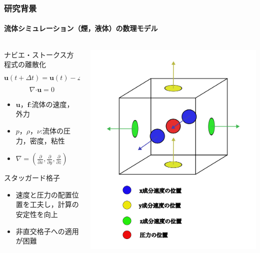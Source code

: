 \documentclass[aspectratio=169,dvipdfmx,hyperref={bookmarks=true}]{beamer}
\begin{document}
  \begin{frame}
  \frametitle{研究背景}
  \framesubtitle{流体シミュレーション（煙，液体）の数理モデル}

\begin{columns}[T]
	\begin{column}{0.65\linewidth}
	    \begin{block}{ナビエ・ストークス方程式の離散化}
    	\[
	\bm{u}(t + \varDelta t)  =\bm{u}(t) -\varDelta t( (\bm{u} \boldsymbol{\cdot}\nabla) \bm{u} - \frac{1}{\rho}\nabla p + \nu\nabla^2\bm{u} + \bm{f})
	\]
	\[
	\nabla\boldsymbol{\cdot}\bm{u} = 0
	\]
	\vspace{-10pt}
	\begin{itemize}
	\item $\bm{u}$，$\bm{f}$:流体の速度，外力
	\item $p$，$\rho$，$\nu$:流体の圧力，密度，粘性
	\item $\nabla = ( \frac{\partial}{\partial x}, \frac{\partial}{\partial y}, \frac{\partial}{\partial z})$
\end{itemize}
\end{block}
	\begin{block}{スタッガード格子}
		\begin{itemize}
		\item 速度と圧力の配置位置を工夫し，計算の安定性を向上
		\item 非直交格子への適用が困難
	\end{itemize}
	\end{block}
    	\end{column}
	\begin{column}{0.35\linewidth}
	\includegraphics[width=1.1\linewidth]{images/3dstaggerd.png}
	\label{fig:staggerd}
    	\end{column}
    \end{columns}
\end{frame}
\end{document}
